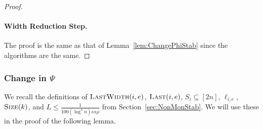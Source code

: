 \documentclass[11pt]{article}
\begin{document}
\begin{proof}
\paragraph*{Width Reduction Step.}
The proof is the same as that of Lemma~\ref{lem:ChangePhiStab} since the algorithms are the same.
\end{proof}


\subsubsection*{Change in $\Psi$}
We recall the definitions of $\textsc{LastWidth}(i,e)$, $\textsc{Last}(i,e)$, $S_i \subseteq [2n]$, $\ell_{i,e}$, $\textsc{Size}(k)$, and $L \leq \frac{1}{100 (\log^4 n) \epsilon \alpha \rho}$ from Section~\ref{sec:NonMonStab}. We will use these in the proof of the following lemma. 
\end{document}
